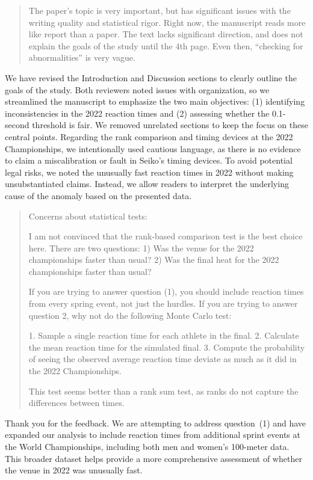 \documentclass[12pt]{article}
\newenvironment{comment}%
{\begin{quotation}\noindent\small\it\color{darkblue}\ignorespaces%
}{\end{quotation}}
\begin{document}
\begin{comment}
The paper’s topic is very important, but has significant issues with the writing
quality and statistical rigor. Right now, the manuscript reads more like report
than a paper. The text lacks significant direction, and does not explain the
goals of the study until the 4th page. Even then, “checking for abnormalities”
is very vague.
\end{comment}


We have revised the Introduction and Discussion sections to clearly
outline the goals of the study. Both reviewers noted issues with
organization, so we streamlined the manuscript to emphasize the two
main objectives: (1) identifying inconsistencies in the 2022 reaction
times and (2) assessing whether the 0.1-second threshold is fair. We
removed unrelated sections to keep the focus on these central
points. Regarding the rank comparison and timing devices at the 2022
Championships, we intentionally used cautious language, as there is no
evidence to claim a miscalibration or fault in Seiko’s timing
devices. To avoid potential legal risks, we noted the unusually fast
reaction times in 2022 without making unsubstantiated claims. Instead,
we allow readers to interpret the underlying cause of the anomaly
based on the presented data.


\begin{comment}
Concerns about statistical tests:

I am not convinced that the rank-based comparison test is the best choice here.
There are two questions: 1) Was the venue for the 2022 championships faster than
usual? 2) Was the final heat for the 2022 championships faster than usual?

If you are trying to answer question (1), you should include reaction times from
every spring event, not just the hurdles. If you are trying to answer question
2, why not do the following Monte Carlo test:

1. Sample a single reaction time for each athlete in the final.
2. Calculate the mean reaction time for the simulated final.
3. Compute the probability of seeing the observed average reaction time deviate
as much as it did in the 2022 Championships.

This test seems better than a rank sum test, as ranks do not capture the
differences between times.

\end{comment}

Thank you for the feedback. We are attempting to address question~(1)
and have expanded our analysis to include reaction times from
additional sprint events at the World Championships, including both
men and women's 100-meter data. This broader dataset helps provide a
more comprehensive assessment of whether the venue in 2022 was
unusually fast. 
\end{document}
